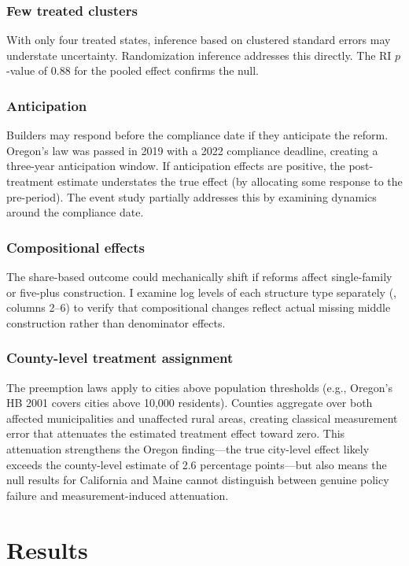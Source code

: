 \documentclass[12pt]{article}
\begin{document}
\subsubsection*{Few treated clusters} With only four treated states, inference based on clustered standard errors may understate uncertainty. Randomization inference addresses this directly. The RI $p$-value of 0.88 for the pooled effect confirms the null.

\subsubsection*{Anticipation} Builders may respond before the compliance date if they anticipate the reform. Oregon's law was passed in 2019 with a 2022 compliance deadline, creating a three-year anticipation window. If anticipation effects are positive, the post-treatment estimate understates the true effect (by allocating some response to the pre-period). The event study partially addresses this by examining dynamics around the compliance date.

\subsubsection*{Compositional effects} The share-based outcome could mechanically shift if reforms affect single-family or five-plus construction. I examine log levels of each structure type separately (, columns 2--6) to verify that compositional changes reflect actual missing middle construction rather than denominator effects.

\subsubsection*{County-level treatment assignment} The preemption laws apply to cities above population thresholds (e.g., Oregon's HB 2001 covers cities above 10,000 residents). Counties aggregate over both affected municipalities and unaffected rural areas, creating classical measurement error that attenuates the estimated treatment effect toward zero. This attenuation strengthens the Oregon finding---the true city-level effect likely exceeds the county-level estimate of 2.6 percentage points---but also means the null results for California and Maine cannot distinguish between genuine policy failure and measurement-induced attenuation.


\section{Results}
\label{sec:results}
\end{document}
